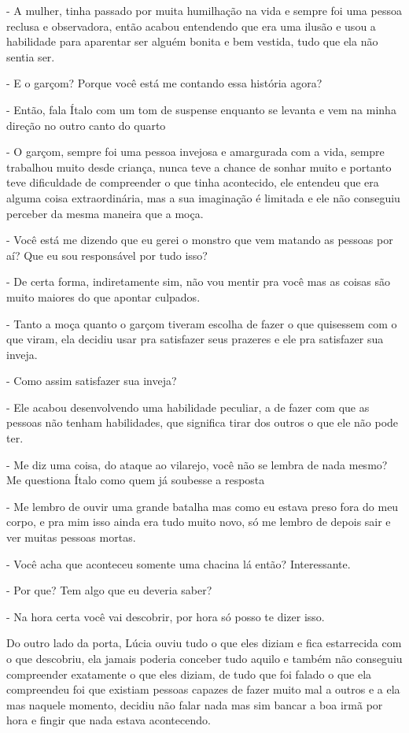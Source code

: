 - A mulher, tinha passado por muita humilhação na vida e sempre foi uma pessoa reclusa e observadora, então acabou entendendo que era uma ilusão e usou a habilidade para aparentar ser alguém bonita e bem vestida, tudo que ela não sentia ser.

- E o garçom? Porque você está me contando essa história agora?

- Então, fala Ítalo com um tom de suspense enquanto se levanta e vem na minha direção no outro canto do quarto

- O garçom, sempre foi uma pessoa invejosa e amargurada com a vida, sempre trabalhou muito desde criança, nunca teve a chance de sonhar muito e portanto teve dificuldade de compreender o que tinha acontecido, ele entendeu que era alguma coisa extraordinária, mas a sua imaginação é limitada e ele não conseguiu perceber da mesma maneira que a moça.

- Você está me dizendo que eu gerei o monstro que vem matando as pessoas por aí? Que eu sou responsável por tudo isso?

- De certa forma, indiretamente sim, não vou mentir pra você mas as coisas são muito maiores do que apontar culpados.

- Tanto a moça quanto o garçom tiveram escolha de fazer o que quisessem com o que viram, ela decidiu usar pra satisfazer seus prazeres e ele pra satisfazer sua inveja.

- Como assim satisfazer sua inveja?

- Ele acabou desenvolvendo uma habilidade peculiar, a de fazer com que as pessoas não tenham habilidades, que significa tirar dos outros o que ele não pode ter.

- Me diz uma coisa, do ataque ao vilarejo, você não se lembra de nada mesmo? Me questiona Ítalo como quem já soubesse a resposta

- Me lembro de ouvir uma grande batalha mas como eu estava preso fora do meu corpo, e pra mim isso ainda era tudo muito novo, só me lembro de depois sair e ver muitas pessoas mortas.

- Você acha que aconteceu somente uma chacina lá então? Interessante.

- Por que? Tem algo que eu deveria saber?

- Na hora certa você vai descobrir, por hora só posso te dizer isso.

Do outro lado da porta, Lúcia ouviu tudo o que eles diziam e fica estarrecida com o que descobriu, ela jamais poderia conceber tudo aquilo e também não conseguiu compreender exatamente o que eles diziam, de tudo que foi falado o que ela compreendeu foi que existiam pessoas capazes de fazer muito mal a outros e a ela mas naquele momento, decidiu não falar nada mas sim bancar a boa irmã por hora e fingir que nada estava acontecendo.

